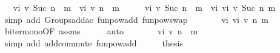 \begin{isabellebody}
\ \ \ {\isachardoublequoteopen}vi\ v\ {\isacharparenleft}{\kern0pt}Suc\ n\ {\isacharplus}{\kern0pt}\ m{\isacharparenright}{\kern0pt}\ {\isasymle}\ vi\ v\ {\isacharparenleft}{\kern0pt}n\ {\isacharplus}{\kern0pt}\ m{\isacharparenright}{\kern0pt}{\isachardoublequoteclose}\isanewline
%
\isadelimproof
%
\endisadelimproof
%
\isatagproof
{}\isamarkupfalse%
\ {\isacharminus}{\kern0pt}\isanewline
\ \ \isamarkupfalse%
\ {\isachardoublequoteopen}vi\ v\ {\isacharparenleft}{\kern0pt}Suc\ n\ {\isacharplus}{\kern0pt}\ m{\isacharparenright}{\kern0pt}\ {\isacharequal}{\kern0pt}\ vi\ {\isacharparenleft}{\kern0pt}vi\ v\ {\isacharparenleft}{\kern0pt}Suc\ n{\isacharparenright}{\kern0pt}{\isacharparenright}{\kern0pt}\ m{\isachardoublequoteclose}\isanewline
\ \ \ \ \isamarkupfalse%
\ {\isacharparenleft}{\kern0pt}simp\ add{\isacharcolon}{\kern0pt}\ Groups{\isachardot}{\kern0pt}add{\isacharunderscore}{\kern0pt}ac{\isacharparenleft}{\kern0pt}{}{\isacharparenright}{\kern0pt}\ funpow{\isacharunderscore}{\kern0pt}add\ funpow{\isacharunderscore}{\kern0pt}swap{}{\isacharparenright}{\kern0pt}\isanewline
\ \ \isamarkupfalse%
\ \isamarkupfalse%
\ {\isachardoublequoteopen}{\isachardot}{\kern0pt}{\isachardot}{\kern0pt}{\isachardot}{\kern0pt}\ {\isasymle}\ vi\ {\isacharparenleft}{\kern0pt}vi\ v\ n{\isacharparenright}{\kern0pt}\ m{\isachardoublequoteclose}\isanewline
\ \ \ \ \isamarkupfalse%
\ {\isasymL}\isactrlsub b{\isacharunderscore}{\kern0pt}iter{\isacharunderscore}{\kern0pt}mono{\isacharbrackleft}{\kern0pt}OF\ assms{\isacharbrackright}{\kern0pt}\isanewline
\ \ \ \ \isamarkupfalse%
\ auto\isanewline
\ \ \isamarkupfalse%
\ \isamarkupfalse%
\ {\isachardoublequoteopen}{\isachardot}{\kern0pt}{\isachardot}{\kern0pt}{\isachardot}{\kern0pt}\ {\isacharequal}{\kern0pt}\ vi\ v\ {\isacharparenleft}{\kern0pt}n\ {\isacharplus}{\kern0pt}\ m{\isacharparenright}{\kern0pt}{\isachardoublequoteclose}\isanewline
\ \ \ \ \isamarkupfalse%
\ {\isacharparenleft}{\kern0pt}simp\ add{\isacharcolon}{\kern0pt}\ add{\isachardot}{\kern0pt}commute\ funpow{\isacharunderscore}{\kern0pt}add{\isacharparenright}{\kern0pt}\isanewline
\ \ \isamarkupfalse%
\ \isamarkupfalse%
\ {\isacharquery}{\kern0pt}thesis\ \isacommand{{\isachardot}{\kern0pt}}\isamarkupfalse%
\isanewline
{}\isamarkupfalse%
%
\endisatagproof
{\isafoldproof}%
%
\isadelimproof
\isanewline
%
\endisadelimproof

\end{isabellebody}
